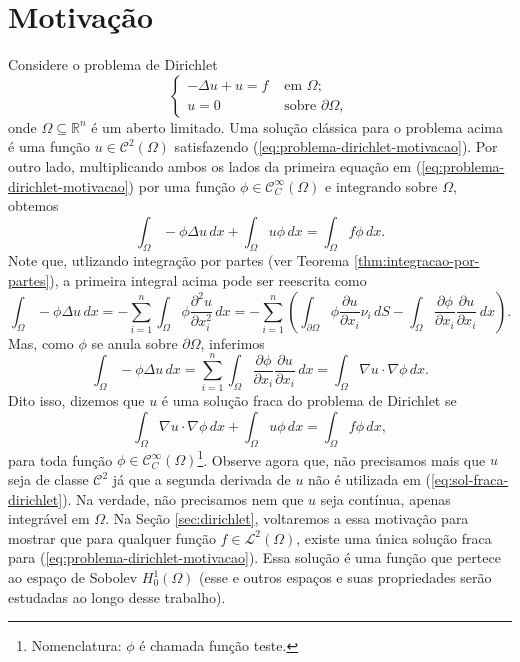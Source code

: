 \documentclass[a4paper, 11pt]{book}
\theoremstyle{definition}
\newcommand{\bR}{\mathbb{R}}
\newcommand{\cC}{\mathcal{C}}
\newcommand{\cL}{\mathcal{L}}
\begin{document}
\section{Motivação}
Considere o problema de Dirichlet
\begin{equation} \label{eq:problema-dirichlet-motivacao}
    \left\{  
        \begin{aligned}
            -\Delta u + u = f &\text{ em } \Omega;\\
            u = 0 &\text{ sobre } \partial\Omega,
        \end{aligned}
    \right.
\end{equation}
onde $\Omega \subseteq \bR^n$ é um aberto limitado.
Uma solução clássica para o problema acima é uma função $u \in \cC^2(\Omega)$ satisfazendo (\ref{eq:problema-dirichlet-motivacao}). 
Por outro lado, multiplicando ambos os lados da primeira equação em (\ref{eq:problema-dirichlet-motivacao}) por uma função $\phi \in \cC^{\infty}_C(\Omega)$ e integrando sobre $\Omega$, obtemos
\[
    \int_\Omega - \phi \Delta u \,dx + \int_\Omega u \phi \,dx = \int_\Omega f \phi \,dx.
\]
Note que, utlizando integração por partes (ver Teorema \ref{thm:integracao-por-partes}), a primeira integral acima pode ser reescrita como
\[
    \int_\Omega -\phi \Delta u \,dx = -\sum_{i=1}^n \int_\Omega \phi \frac{\partial^2 u}{\partial x_i^2} \,dx = -\sum_{i=1}^n \left( \int_{\partial\Omega} \phi \frac{\partial u}{\partial x_i} \nu_i \,dS - \int_\Omega \frac{\partial \phi}{\partial x_i} \frac{\partial u}{\partial x_i} \,dx\right).
\]
Mas, como $\phi$ se anula sobre $\partial \Omega$, inferimos
\[
    \int_\Omega -\phi \Delta u \,dx = \sum_{i=1}^n \int_\Omega \frac{\partial \phi}{\partial x_i} \frac{\partial u}{\partial x_i} \,dx = \int_{\Omega} \nabla u \cdot \nabla \phi \,dx.
\]
Dito isso, dizemos que $u$ é uma solução fraca do problema de Dirichlet se
\begin{equation} \label{eq:sol-fraca-dirichlet}
    \int_{\Omega} \nabla u \cdot \nabla \phi \,dx + \int_\Omega u\phi \,dx = \int_\Omega f \phi \,dx,
\end{equation}
para toda função $\phi \in \cC^{\infty}_C(\Omega)$\footnote{Nomenclatura: $\phi$ é chamada função teste.}.
Observe agora que, não precisamos mais que $u$ seja de classe $\cC^2$ já que a segunda derivada de $u$ não é utilizada em (\ref{eq:sol-fraca-dirichlet}). Na verdade, não precisamos nem que $u$ seja contínua, apenas integrável em $\Omega$.
Na Seção \ref{sec:dirichlet}, voltaremos a essa motivação para mostrar que para qualquer função $f \in \cL^2(\Omega)$, existe uma única solução fraca para (\ref{eq:problema-dirichlet-motivacao}). 
Essa solução é uma função que pertece ao espaço de Sobolev $H^1_0(\Omega)$ (esse e outros espaços e suas propriedades serão estudadas ao longo desse trabalho).
\end{document}

